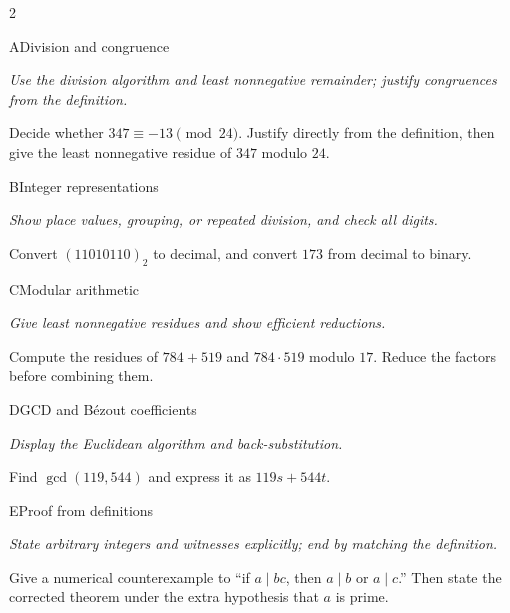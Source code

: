 \documentclass[9pt]{extarticle}
\begin{document}
\begin{multicols}{2}
\begin{CoreProblem}{A}{Division and congruence}
{\scriptsize\textit{Use the division algorithm and least nonnegative remainder; justify congruences from the definition.}\par}
Decide whether $347\equiv-13\pmod{24}$. Justify directly from the definition,
then give the least nonnegative residue of $347$ modulo $24$.
\end{CoreProblem}
\begin{CoreProblem}{B}{Integer representations}
{\scriptsize\textit{Show place values, grouping, or repeated division, and check all digits.}\par}
Convert $(11010110)_2$ to decimal, and convert $173$ from decimal to binary.
\end{CoreProblem}
\begin{CoreProblem}{C}{Modular arithmetic}
{\scriptsize\textit{Give least nonnegative residues and show efficient reductions.}\par}
Compute the residues of $784+519$ and $784\cdot519$ modulo $17$. Reduce the
factors before combining them.
\end{CoreProblem}
\columnbreak
\begin{CoreProblem}{D}{GCD and B\'ezout coefficients}
{\scriptsize\textit{Display the Euclidean algorithm and back-substitution.}\par}
Find $\gcd(119,544)$ and express it as $119s+544t$.
\end{CoreProblem}
\begin{CoreProblem}{E}{Proof from definitions}
{\scriptsize\textit{State arbitrary integers and witnesses explicitly; end by matching the definition.}\par}
Give a numerical counterexample to ``if $a\mid bc$, then $a\mid b$ or
$a\mid c$.'' Then state the corrected theorem under the extra hypothesis that
$a$ is prime.
\end{CoreProblem}
\end{multicols}
\CoreWorkArea
\FormBreak
{}
\end{document}

